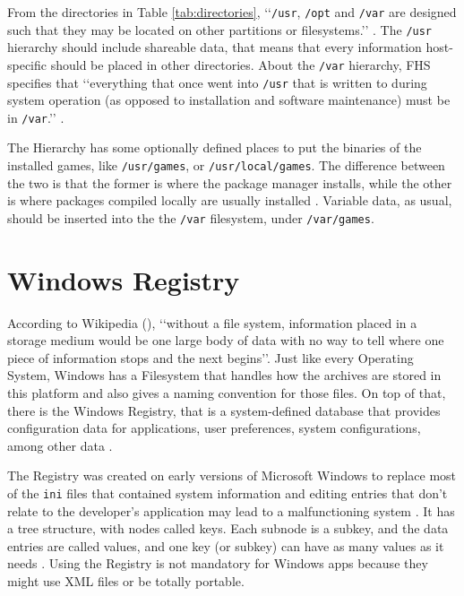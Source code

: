 From the directories in Table \ref{tab:directories}, \lq\lq \texttt{/usr}, \texttt{/opt} and \texttt{/var} are designed such that they may be located on other partitions or filesystems.\rq\rq{} \cite{allbery2015filesystem}. The \texttt{/usr} hierarchy should include shareable data, that means that every information host-specific should be placed in other directories. About the \texttt{/var} hierarchy, FHS specifies that \lq\lq everything that once went into \texttt{/usr} that is written to during system operation (as opposed to installation and software maintenance) must be in \texttt{/var}.\rq\rq{} \cite{allbery2015filesystem}.

The Hierarchy has some optionally defined places to put the binaries of the installed games, like \texttt{/usr/games}, or \texttt{/usr/local/games}. The difference between the two is that the former is where the package manager installs, while the other is where packages compiled locally are usually installed \cite{blfsdevelopmentteam2017}. Variable data, as usual, should be inserted into the the \texttt{/var} filesystem, under \texttt{/var/games}.


\section{Windows Registry}
\label{sec:win_filesystem}

According to Wikipedia (\citeyear{wikipedia2017filesystem}), \lq\lq without a file system, information placed in a storage medium would be one large body of data with no way to tell where one piece of information stops and the next begins\rq\rq{}. Just like every Operating System, Windows has a Filesystem that handles how the archives are stored in this platform and also gives a naming convention for those files. On top of that, there is the Windows Registry, that is a system-defined database \cite{windowsregistry2017} that provides configuration data for applications, user preferences, system configurations, among other data \cite{fisher_2017}.

The Registry was created on early versions of Microsoft Windows to replace most of the \texttt{ini} files that contained system information and editing entries that don't relate to the developer's application may lead to a malfunctioning system \cite{microsoft2017registryinfo}. It has a tree structure, with nodes called keys. Each subnode is a subkey, and the data entries are called values, and one key (or subkey) can have as many values as it needs \cite{windows2017registrystructure}. Using the Registry is not mandatory for Windows apps because they might use XML files or be totally portable. \cite{fisher_2017}


